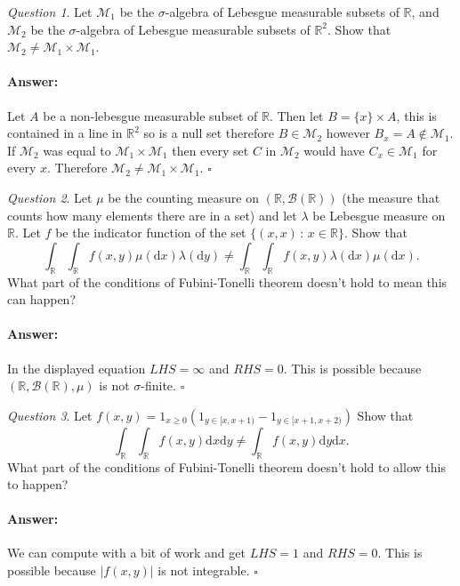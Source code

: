 \documentclass[11pt]{article}
\theoremstyle{definition}
\theoremstyle{remark}
\newtheorem{q}{Question}
\newenvironment{ans}{\paragraph{Answer:}}{\hfill$\square$\vspace{10pt}}
\begin{document}
\begin{q}
Let $\mathcal{M}_1$ be the $\sigma$-algebra of Lebesgue measurable subsets of $\mathbb{R}$, and $\mathcal{M}_2$ be the $\sigma$-algebra of Lebesgue measurable subsets of $\mathbb{R}^2$. Show that $\mathcal{M}_2 \neq \mathcal{M}_1 \times \mathcal{M}_1$. 
\end{q}
\begin{ans}
Let $A$ be a non-lebesgue measurable subset of $\mathbb{R}$. Then let $B = \{x\} \times A$, this is contained in a line in $\mathbb{R}^2$ so is a null set therefore $B \in \mathcal{M}_2$ however $B_x = A \notin \mathcal{M}_1$. If $\mathcal{M}_2$ was equal to $\mathcal{M}_1 \times \mathcal{M}_1$ then every set $C$ in $\mathcal{M}_2$ would have $C_x \in \mathcal{M}_1$ for every $x$. Therefore $\mathcal{M}_2 \neq \mathcal{M}_1 \times \mathcal{M}_1$.
\end{ans}

\begin{q}
Let $\mu$ be the counting measure on $(\mathbb{R}, \mathcal{B}(\mathbb{R}))$ (the measure that counts how many elements there are in a set) and let $\lambda$ be Lebesgue measure on $\mathbb{R}$. Let $f$ be the indicator function of the set $\{(x,x) \,:\, x \in \mathbb{R}\}$. Show that
\[ \int_\mathbb{R} \int_\mathbb{R} f(x,y) \mu(\mathrm{d}x) \lambda(\mathrm{d}y) \neq \int_\mathbb{R} \int_\mathbb{R}  f(x,y) \lambda(\mathrm{d}x) \mu(\mathrm{d}x). \] What part of the conditions of Fubini-Tonelli theorem doesn't hold to mean this can happen?
\end{q}
\begin{ans}
In the displayed equation $LHS = \infty$ and $RHS = 0$. This is possible because $(\mathbb{R}, \mathcal{B}(\mathbb{R}), \mu)$ is not $\sigma$-finite.
\end{ans}

\begin{q}
Let $f(x,y) = 1_{x \geq 0}( 1_{y \in [x,x+1)} - 1_{y \in [x+1, x+2)})$ Show that
\[ \int_\mathbb{R} \int_\mathbb{R} f(x,y) \mathrm{d}x \mathrm{d}y \neq \int_\mathbb{R} f(x,y) \mathrm{d}y \mathrm{d}x. \] What part of the conditions of Fubini-Tonelli theorem doesn't hold to allow this to happen?
\end{q}
\begin{ans}
We can compute with a bit of work and get $LHS = 1$ and $RHS = 0$. This is possible because $|f(x,y)|$ is not integrable.
\end{ans}
\end{document}
